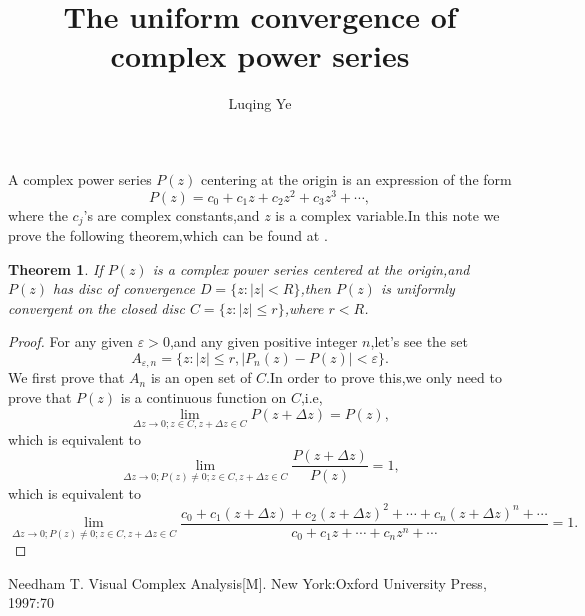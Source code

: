 \documentclass{amsart}
\theoremstyle{plain}
\newtheorem{theorem}{Theorem}
\theoremstyle{definition}
\begin{document}
\title{The uniform convergence of complex power series}

\author{Luqing Ye}
\address{College of Science, Hangzhou Normal University,Hangzhou City,Zhejiang Province,China}

\maketitle

\setcounter{tocdepth}{2}
A complex power series $P(z)$ centering at the origin is an expression of the form
$$P(z)=c_{0}+c_{1}z+c_{2}z^{2}+c_{3}z^{3}+\cdots,$$
where the $c_{j}$'s are complex constants,and $z$ is a complex variable.In this note we prove the following theorem,which can be found at \cite{visual}.
\begin{theorem}
  If $P(z)$ is a complex power series centered at the origin,and
  $P(z)$ has disc of convergence $D=\{z:|z|<R\}$,then $P(z)$ is uniformly
  convergent on the closed disc $C=\{z:|z|\leq r\}$,where $r<R$.
\end{theorem}
\begin{proof}
For any given $\varepsilon>0$,and any given positive integer $n$,let's see the set 
$$
A_{\varepsilon,n}=\{z:|z|\leq r,|P_n(z)-P(z)|<\varepsilon\}.
$$
We first prove that $A_n$ is an open set of $C$.In order to prove
this,we only need to prove that $P(z)$ is a continuous function on $C$,i.e,
\begin{equation}\label{eq:1}
\lim_{\Delta z\to 0;z\in C,z+\Delta z\in C} P(z+\Delta z)=P(z),
\end{equation}
which is equivalent to 
$$
\lim_{\Delta z\to 0;P(z)\neq 0;z\in C,z+\Delta z\in
  C}\frac{P(z+\Delta z)}{P(z)}=1,
$$
which is equivalent to
$$
\lim_{\Delta z\to
  0;P(z)\neq 0;z\in C,z+\Delta z\in
  C}\frac{c_0+c_1(z+\Delta
  z)+c_2(z+\Delta z)^2+\cdots+c_{n}(z+\Delta z)^n+\cdots}{c_0+c_1z+\cdots+c_nz^n+\cdots}=1.
$$


\end{proof}


\begin{thebibliography}{1}

Needham T. Visual Complex Analysis[M]. New York:Oxford University Press, 1997:70

\end{thebibliography}
\end{document}
